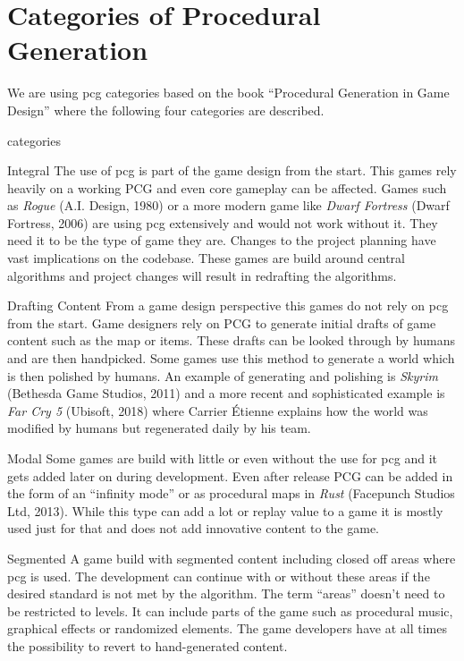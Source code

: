 \documentclass[10pt,a4paper]{article}
\begin{document}
\section{Categories of Procedural Generation}
We are using \gls{pcg} categories based on the book “Procedural Generation in Game Design”\citep[p.~3]{Short:2017:PGG:3161477} where the following four categories are described.
\begin{labeling}{categories}\label{sec:categories}
\item [Integral] The use of \gls{pcg} is part of the game design from the start. This games rely heavily on a working PCG and even core gameplay can be affected. Games such as \textit{Rogue} (A.I. Design, 1980) or a more modern game like \textit{Dwarf Fortress} (Dwarf Fortress, 2006) are using \gls{pcg} extensively and would not work without it. They need it to be the type of game they are. Changes to the project planning have vast implications on the codebase. These games are build around central algorithms and project changes will result in redrafting the algorithms.

\item [Drafting Content] From a game design perspective this games do not rely on \gls{pcg} from the start. Game designers rely on PCG to generate initial drafts of game content such as the map or items. These drafts can be looked through by humans and are then handpicked. Some games use this method to generate a world which is then polished by humans. An example of generating and polishing is \textit{Skyrim} (Bethesda Game Studios, 2011) and a more recent and sophisticated example is \textit{Far Cry 5} (Ubisoft, 2018) where Carrier Étienne explains how the world was modified by humans but regenerated daily by his team\cite{Carrier2018}.

\item [Modal] Some games are build with little or even without the use for \gls{pcg} and it gets added later on during development. Even after release PCG can be added in the form of an “infinity mode” or as procedural maps in \textit{Rust} (Facepunch Studios Ltd, 2013). While this type can add a lot or replay value to a game it is mostly used just for that and does not add innovative content to the game.

\item [Segmented] A game build with segmented content including closed off areas where \gls{pcg} is used. The development can continue with or without these areas if the desired standard is not met by the algorithm. The term “areas” doesn’t need to be restricted to levels. It can include parts of the game such as procedural music, graphical effects or randomized elements. The game developers have at all times the possibility to revert to hand-generated content.
\end{labeling}
\end{document}
